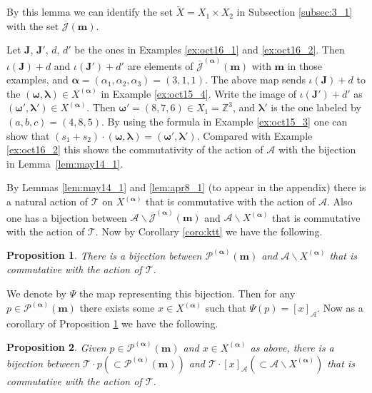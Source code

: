 \documentclass[11pt]{article}
\newtheorem{proposition}{Proposition}
\newcommand{\Z}{{\mathbb Z}}
\newcommand{\Jb}{{\overline{\mathcal J}}}
\newcommand\bom{\boldsymbol{\omega}}
\newcommand\bol{\boldsymbol{\lambda}}
\newcommand\boa{\boldsymbol{\alpha}}
\newcommand{\m}{{\boldsymbol m}}
\newcommand{\boJ}{{\boldsymbol J}}
\begin{document}
By this lemma we can identify the set $\tilde{X} = X_1 \times X_2$ in Subsection \ref{subsec:3_1}
with the set
$\Jb (\m)$.

\begin{example}\label{ex:oct16_3}
Let $\boJ$, $\boJ'$, $d$, $d'$ be the ones in Examples \ref{ex:oct16_1} and \ref{ex:oct16_2}.
Then
$\iota (\boJ) + d$ and $\iota (\boJ') + d'$ are elements of $\Jb^{(\boa)} (\m)$ with
$\m$ in those examples, and $\boa = (\alpha_1, \alpha_2, \alpha_3) = (3,1,1)$.
%
The above map sends $\iota (\boJ) + d$ to the $(\bom, \bol) \in X^{(\boa)}$ in Example \ref{ex:oct15_4}.
Write the image of $\iota (\boJ') + d'$ as $(\bom', \bol') \in X^{(\boa)}$.
Then $\bom' = (8,7,6) \in X_1 = \Z^3$, and $\bol'$ is the one labeled by $(a,b,c) = (4,8,5)$.
%
By using the formula in Example \ref{ex:oct15_3} one can show that $(s_1 + s_2) \cdot (\bom, \bol) = (\bom', \bol')$.
Compared with Example \ref{ex:oct16_2} this shows the commutativity of the action of ${\mathcal A}$ with
the bijection in Lemma~\ref{lem:may14_1}.
\end{example}

By Lemmas \ref{lem:may14_1} and \ref{lem:apr8_1} (to appear in the appendix)
there is a natural action of ${\mathcal T}$ on $X^{(\boa)}$ that is commutative with the action of ${\mathcal A}$.
Also one has a bijection between {${\mathcal A} \backslash \Jb^{(\boa)} (\m)$} and
${\mathcal A} \backslash X^{(\boa)}$ that is commutative with the action of ${\mathcal T}$.
Now by Corollary \ref{coro:ktt} we have the following.
\begin{proposition}\label{prop:may14_2}
There is a bijection between ${\mathcal P}^{(\boa)}(\m)$ and ${\mathcal A} \backslash X^{(\boa)}$
that is commutative with the action of ${\mathcal T}$.
\end{proposition}
{We denote by $\Psi$ the map representing this bijection.
Then for any $p \in {\mathcal P}^{(\boa)}(\m)$ there exists some $x \in X^{(\boa)}$ such that
$\Psi (p) =  [x]_{\mathcal A}$.
Now as a corollary of Proposition \ref{prop:may14_2} we have the following.}
\begin{proposition}\label{prop:apr22_3}
Given $p \in {\mathcal P}^{(\boa)}(\m)$ and $x \in X^{(\boa)}$ as above,
there is a bijection between ${\mathcal T} \cdot p (\subset {\mathcal P}^{(\boa)}(\m))$
and ${\mathcal T} \cdot  [x]_{\mathcal A} (\subset {\mathcal A} \backslash X^{(\boa)})$
that is commutative with the action of ${\mathcal T}$.
\end{proposition}
\end{document}
